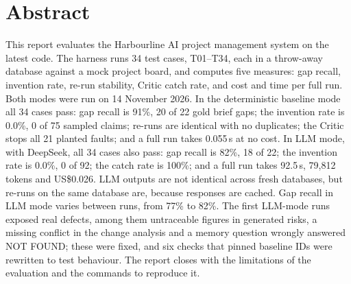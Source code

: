 \chapter*{Abstract}
This report evaluates the Harbourline AI project management system on the latest code. The harness  runs 34 test cases, T01--T34, each in a throw-away database against a mock project board, and computes five measures: gap recall, invention rate, re-run stability, Critic catch rate, and cost and time per full run. Both modes were run on 14 November 2026. In the deterministic baseline mode all 34 cases pass: gap recall is 91\%, 20 of 22 gold brief gaps; the invention rate is 0.0\%, 0 of 75 sampled claims; re-runs are identical with no duplicates; the Critic stops all 21 planted faults; and a full run takes 0.055\,s at no cost. In LLM mode, with DeepSeek, all 34 cases also pass: gap recall is 82\%, 18 of 22; the invention rate is 0.0\%, 0 of 92; the catch rate is 100\%; and a full run takes 92.5\,s, 79,812 tokens and US\$0.026. LLM outputs are not identical across fresh databases, but re-runs on the same database are, because responses are cached. Gap recall in LLM mode varies between runs, from 77\% to 82\%. The first LLM-mode runs exposed real defects, among them untraceable figures in generated risks, a missing conflict in the change analysis and a memory question wrongly answered NOT FOUND; these were fixed, and six checks that pinned baseline IDs were rewritten to test behaviour. The report closes with the limitations of the evaluation and the commands to reproduce it.
